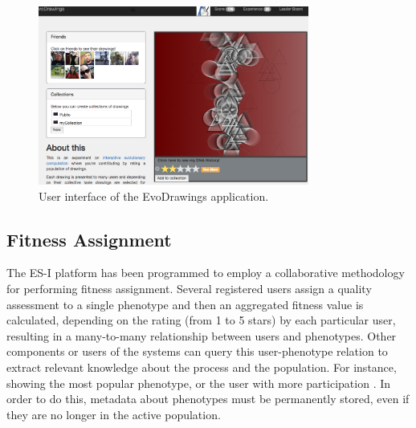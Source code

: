 \begin{figure}[!t]
    \centering
        \includegraphics[width=3.5in]{img/interface.png}
    \caption{User interface of the EvoDrawings application.}
    \label{fig:web}
\end{figure}

\subsection{Fitness Assignment}
The ES-I platform has been programmed to employ a 
collaborative methodology for performing fitness assignment. 
Several registered users assign a quality assessment to a single
phenotype and then an aggregated fitness value is calculated,
depending on the rating (from 1 to 5 stars) by each particular user,  
resulting in a many-to-many relationship between users and
phenotypes. Other components or users of the systems can 
query this user-phenotype relation to extract relevant
knowledge about the process and the population. For instance, showing the
most popular phenotype, or the user with more participation 
\cite{picbreeder}.
In order to do this, metadata about phenotypes 
must be permanently stored, even
if they are no longer in the active population. 

